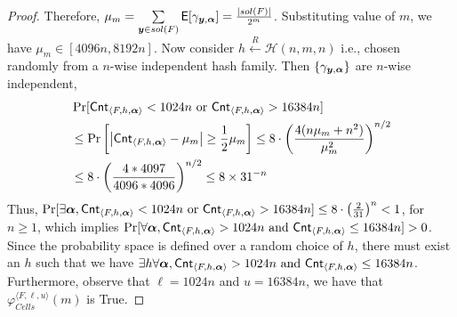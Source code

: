 {\begin{proof}
Therefore, $\mu_{m} = \sum\limits_{{\boldsymbol{y}}	\in sol({F})} \mathsf{E}[\gamma_{{\boldsymbol{y}},{\boldsymbol{\alpha}}}] = \frac{|sol({F})|}{2^m}$. Substituting value of $m$, we have $\mu_{m} \in [4096n,8192n] $. Now consider $h\xleftarrow{R}\mathcal{H}(n,m,n)$ i.e., chosen randomly from a $n$-wise independent hash family. Then $\{\gamma_{{\boldsymbol{y}},{\boldsymbol{\alpha}}}\}$ are $n$-wise independent,
\begin{align*}
	&\Pr[\mathsf{Cnt}_{\langle F, h,{\boldsymbol{\alpha}} \rangle} < 1024n \text{ or } \mathsf{Cnt}_{\langle F, h,{\boldsymbol{\alpha}} \rangle} > 16384n]\\ 
	&\leq 	\Pr\left[ \left|\mathsf{Cnt}_{\langle F, h,{\boldsymbol{\alpha}} \rangle} - \mu_{m} \right| \geq \frac{1}{2} \mu_{m} \right] 
	\leq 8 \cdot \left( \frac{4(n\mu_{m} + n^2)}{\mu_{m}^2} \right)^{n/2}\\
	&\leq 8 \cdot \left(\frac{4*4097}{4096*4096}\right)^{n/2} \leq 8 \times 31^{-n} 
\end{align*}
Thus, $\Pr[\exists {\boldsymbol{\alpha}}, \mathsf{Cnt}_{\langle F, h,{\boldsymbol{\alpha}} \rangle} < 1024n \text{ or }  \mathsf{Cnt}_{\langle F, h,{\boldsymbol{\alpha}} \rangle} >  16384n] \leq 8 \cdot \left(\frac{2}{31}\right)^{n}<1$, for $n\geq 1$, which implies $\Pr[\forall {\boldsymbol{\alpha}}, \mathsf{Cnt}_{\langle F, h,{\boldsymbol{\alpha}} \rangle} > 1024n \text{ and }  \mathsf{Cnt}_{\langle F, h,{\boldsymbol{\alpha}} \rangle} \leq  16384n] >0$. 
Since the probability space is defined over a random choice of $h$, there must exist an $h$ such that we have $\exists h \forall {\boldsymbol{\alpha}}, \mathsf{Cnt}_{\langle F, h,{\boldsymbol{\alpha}} \rangle} > 1024n \text{ and }  \mathsf{Cnt}_{\langle F, h,{\boldsymbol{\alpha}} \rangle} \leq  16384n$. Furthermore, observe that $\ell = 1024n$ and $u = 16384n$, we have that $\varphi^{\langle F, \ell, u \rangle}_{Cells}(m)$ is True. 



\end{proof}
}
